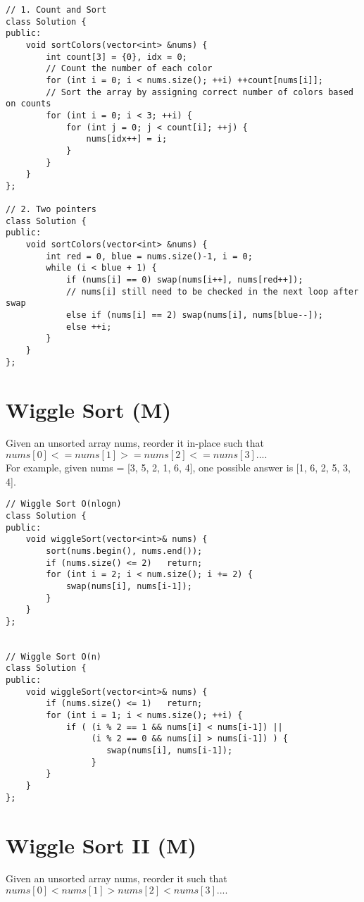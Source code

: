 \begin{lstlisting}
// 1. Count and Sort
class Solution {
public:
    void sortColors(vector<int> &nums) {
        int count[3] = {0}, idx = 0;
        // Count the number of each color
        for (int i = 0; i < nums.size(); ++i) ++count[nums[i]];
        // Sort the array by assigning correct number of colors based on counts
        for (int i = 0; i < 3; ++i) {
            for (int j = 0; j < count[i]; ++j) {
                nums[idx++] = i;
            }
        }
    }
};

// 2. Two pointers
class Solution {
public:
    void sortColors(vector<int> &nums) {
        int red = 0, blue = nums.size()-1, i = 0;
        while (i < blue + 1) {
            if (nums[i] == 0) swap(nums[i++], nums[red++]);
            // nums[i] still need to be checked in the next loop after swap
            else if (nums[i] == 2) swap(nums[i], nums[blue--]);
            else ++i;
        }
    }
};
\end{lstlisting}


\section{Wiggle Sort (M)}
Given an unsorted array nums, reorder it in-place such that $nums[0] <= nums[1] >= nums[2] <= nums[3]....$\\

For example, given nums = [3, 5, 2, 1, 6, 4], one possible answer is [1, 6, 2, 5, 3, 4].\\

\begin{lstlisting}
// Wiggle Sort O(nlogn)
class Solution {
public:
    void wiggleSort(vector<int>& nums) {
        sort(nums.begin(), nums.end());
        if (nums.size() <= 2)   return;
        for (int i = 2; i < num.size(); i += 2) {
            swap(nums[i], nums[i-1]);
        }
    }
};


// Wiggle Sort O(n)
class Solution {
public:
    void wiggleSort(vector<int>& nums) {
        if (nums.size() <= 1)   return;
        for (int i = 1; i < nums.size(); ++i) {
            if ( (i % 2 == 1 && nums[i] < nums[i-1]) ||
                 (i % 2 == 0 && nums[i] > nums[i-1]) ) {
                    swap(nums[i], nums[i-1]);
                 }
        }
    }
};
\end{lstlisting}


\section{Wiggle Sort II (M)}
Given an unsorted array nums, reorder it such that $nums[0] < nums[1] > nums[2] < nums[3]....$ \\

